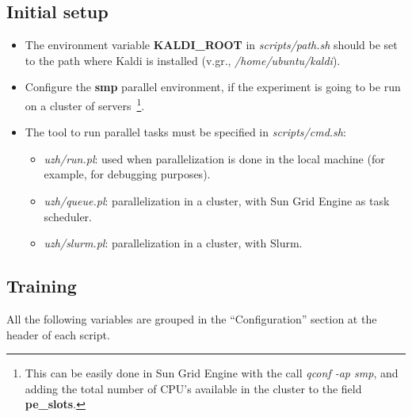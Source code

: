 \documentclass[11pt,a4paper,titlepage,twoside]{article}
\begin{document}
\subsection{Initial setup}
\label{sec:initial-setup}

\begin{itemize}
\item The environment variable \textbf{KALDI\_ROOT} in \textit{scripts/path.sh} should be set to the path where Kaldi is installed (v.gr., \textit{/home/ubuntu/kaldi}).
\item Configure the \textbf{smp} parallel environment, if the experiment is going to be run on a cluster of servers~\footnote{This can be easily done in Sun Grid Engine with the call \textit{qconf -ap smp}, and adding the total number of CPU's available in the cluster to the field \textbf{pe\_slots}.}.
\item The tool to run parallel tasks must be specified in \textit{scripts/cmd.sh}:
  \begin{itemize}
  \item \textit{uzh/run.pl}: used when parallelization is done in the local machine (for example, for debugging purposes).
  \item \textit{uzh/queue.pl}: parallelization in a cluster, with Sun Grid Engine as task scheduler.
  \item \textit{uzh/slurm.pl}: parallelization in a cluster, with Slurm.
  \end{itemize}
\end{itemize}

\subsection{Training}
\label{sec:training}

All the following variables are grouped in the ``Configuration'' section at the header of each script.
\end{document}
